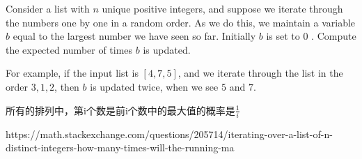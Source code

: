 \problem{}

Consider a list with $n$ unique positive integers, and suppose we iterate through the numbers one by one in a random order. As we do this, we maintain a variable $b$ equal to the largest number we have seen so far. Initially $b$ is set to 0 . Compute the expected number of times $b$ is updated.

For example, if the input list is $[4,7,5]$, and we iterate through the list in the order $3,1,2$, then $b$ is updated twice, when we see $5$ and $7$.

\solution{}



所有的排列中，第i个数是前i个数中的最大值的概率是$\frac{1}{i}$



https://math.stackexchange.com/questions/205714/iterating-over-a-list-of-n-distinct-integers-how-many-times-will-the-running-ma